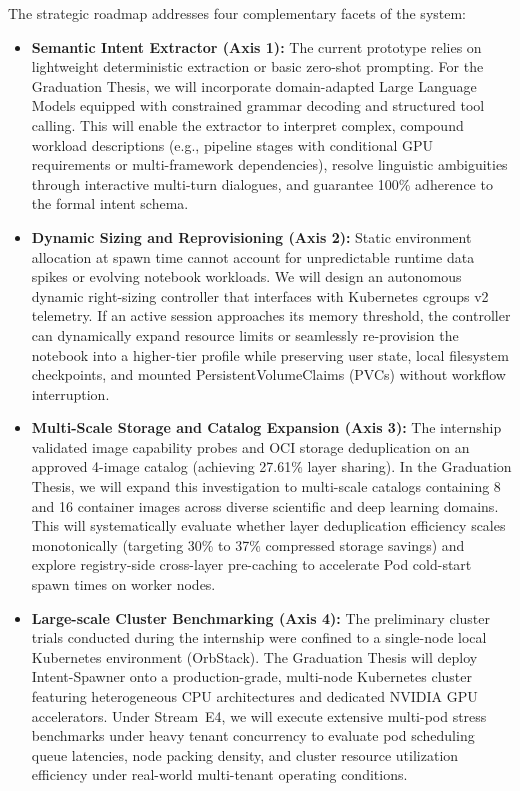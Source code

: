 The strategic roadmap addresses four complementary facets of the system:
\begin{itemize}
    \item \textbf{Semantic Intent Extractor (Axis 1):} The current prototype relies on lightweight deterministic extraction or basic zero-shot prompting. For the Graduation Thesis, we will incorporate domain-adapted Large Language Models equipped with constrained grammar decoding and structured tool calling. This will enable the extractor to interpret complex, compound workload descriptions (e.g., pipeline stages with conditional GPU requirements or multi-framework dependencies), resolve linguistic ambiguities through interactive multi-turn dialogues, and guarantee 100\% adherence to the formal intent schema.

    \item \textbf{Dynamic Sizing and Reprovisioning (Axis 2):} Static environment allocation at spawn time cannot account for unpredictable runtime data spikes or evolving notebook workloads. We will design an autonomous dynamic right-sizing controller that interfaces with Kubernetes cgroups v2 telemetry. If an active session approaches its memory threshold, the controller can dynamically expand resource limits or seamlessly re-provision the notebook into a higher-tier profile while preserving user state, local filesystem checkpoints, and mounted PersistentVolumeClaims (PVCs) without workflow interruption.

    \item \textbf{Multi-Scale Storage and Catalog Expansion (Axis 3):} The internship validated image capability probes and OCI storage deduplication on an approved 4-image catalog (achieving 27.61\% layer sharing). In the Graduation Thesis, we will expand this investigation to multi-scale catalogs containing 8 and 16 container images across diverse scientific and deep learning domains. This will systematically evaluate whether layer deduplication efficiency scales monotonically (targeting 30\% to 37\% compressed storage savings) and explore registry-side cross-layer pre-caching to accelerate Pod cold-start spawn times on worker nodes.

    \item \textbf{Large-scale Cluster Benchmarking (Axis 4):} The preliminary cluster trials conducted during the internship were confined to a single-node local Kubernetes environment (OrbStack). The Graduation Thesis will deploy Intent-Spawner onto a production-grade, multi-node Kubernetes cluster featuring heterogeneous CPU architectures and dedicated NVIDIA GPU accelerators. Under Stream~E4, we will execute extensive multi-pod stress benchmarks under heavy tenant concurrency to evaluate pod scheduling queue latencies, node packing density, and cluster resource utilization efficiency under real-world multi-tenant operating conditions.
\end{itemize}

